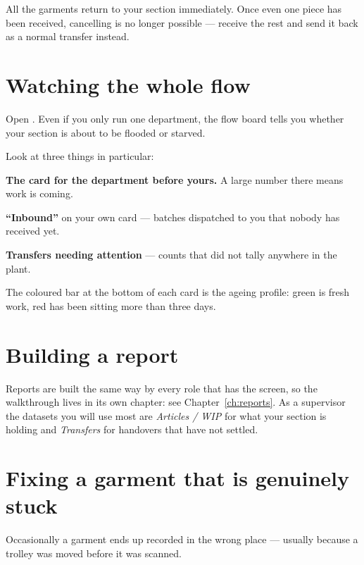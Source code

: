 All the garments return to your section immediately. Once even one piece has been
received, cancelling is no longer possible --- receive the rest and send it back
as a normal transfer instead.

\section{Watching the whole flow}

Open . Even if you only run one department, the flow board tells
you whether your section is about to be flooded or starved.


Look at three things in particular:

\begin{bullets}
  \item \textbf{The card for the department before yours.} A large number there
        means work is coming.
  \item \textbf{``Inbound''} on your own card --- batches dispatched to you that
        nobody has received yet.
  \item \textbf{Transfers needing attention} --- counts that did not tally
        anywhere in the plant.
\end{bullets}

The coloured bar at the bottom of each card is the ageing profile: green is fresh
work, red has been sitting more than three days.

\section{Building a report}

Reports are built the same way by every role that has the screen, so the
walkthrough lives in its own chapter: see Chapter~\ref{ch:reports}. As a
supervisor the datasets you will use most are \emph{Articles / WIP} for what your
section is holding and \emph{Transfers} for handovers that have not settled.

\section{Fixing a garment that is genuinely stuck}

Occasionally a garment ends up recorded in the wrong place --- usually because a
trolley was moved before it was scanned.

